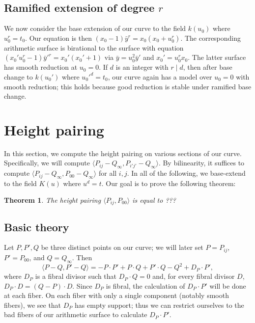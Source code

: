 \documentclass[reqno]{amsart}
\newtheorem{theorem}{Theorem}[section]
\theoremstyle{definition}
\theoremstyle{remark}
\newcommand{\sy}{\bar{y}}
\begin{document}
\subsection{Ramified extension of degree $r$}
\label{sec:ramif-extens-degr}

We now consider the base extension of our curve to the field $k(u_0)$ where $u_0^r = t_0$. Our equation is then $(x_0 - 1)\sy^r = x_0(x_0 + u_0^r)$. The corresponding arithmetic surface is birational to the surface with equation $(x_0'u_0^r - 1)\sy'^r = x_0'(x_0' + 1)$ via $\sy = u_0^2 \sy'$ and $x_0' = u_0^r x_0$. The latter surface has smooth reduction at $u_0 = 0$. If $d$ is an integer with $r \mid d$, then after base change to $k(u_0')$ where $u_0'^d = t_0$, our curve again has a model over $u_0 = 0$ with smooth reduction; this holds because good reduction is stable under ramified base change. 

\section{Height pairing}
\label{sec:height-pairing}

In this section, we compute the height pairing on various sections of our curve. Specifically, we will compute $\langle P_{ij} - Q_\infty, P_{i' j'} - Q_\infty \rangle$. By bilinearity, it suffices to compute $\langle P_{ij} - Q_\infty, P_{00} - Q_\infty \rangle$ for all $i,j$. In all of the following, we base-extend to the field $K(u)$ where $u^d = t$. Our goal is to prove the following theorem:

\begin{theorem}\label{thm:height-pairing}
  The height pairing $\langle P_{ij}, P_{00}\rangle$ is equal to ???
\end{theorem}

\subsection{Basic theory}
\label{sec:basic-theory}

Let $P, P', Q$ be three distinct points on our curve; we will later set $P = P_{ij}$, $P' = P_{00}$, and $Q = Q_\infty$. Then
\[
\langle P - Q, P' - Q\rangle = -P \cdot P' + P \cdot Q + P' \cdot Q - Q^2 + D_P \cdot P',
\]
 where $D_P$ is a fibral divisor such that $D_P \cdot Q = 0$ and, for every fibral divisor $D$, $D_P \cdot D = (Q - P) \cdot D$. Since $D_P$ is fibral, the calculation of $D_P \cdot P'$ will be done at each fiber. On each fiber with only a single component (notably smooth fibers), we see that $D_P$ has empty support; thus we can restrict ourselves to the bad fibers of our arithmetic surface to calculate $D_P \cdot P'$. 
\end{document}
